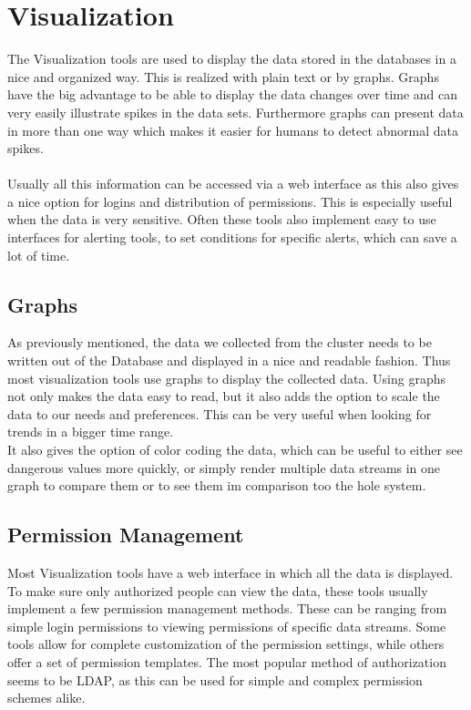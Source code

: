 \section{Visualization} 
The Visualization tools are used to display the data stored in the databases in a nice and organized way. This is realized with plain text or by graphs. Graphs have the big advantage to be able to display the data changes over time and can very easily illustrate spikes in the data sets. Furthermore graphs can present data in more than one way which makes it easier for humans to detect abnormal data spikes.\\
\\ 
Usually all this information can be accessed via a web interface as this also gives a nice option for logins and distribution of permissions. This is especially useful when the data is very sensitive.
Often these tools also implement easy to use interfaces for alerting tools, to set conditions for specific alerts, which can save a lot of time.

\subsection{Graphs}
As previously mentioned, the data we collected from the cluster needs to be written out of the Database and displayed in a nice and readable fashion. Thus most visualization tools use graphs to display the collected data. 
Using graphs not only makes the data easy to read, but it also adds the option to scale the data to our needs and preferences. This can be very useful when looking for trends in a bigger time range.\\
It also gives the option of color coding the data, which can be useful to either see dangerous values more quickly, or simply render multiple data streams in one graph to compare them or to see them im comparison too the hole system.
\subsection{Permission Management}
Most Visualization tools have a web interface in which all the data is displayed. To make sure only authorized people can view the data, these tools usually implement a few permission management methods. 
These can be ranging from simple login permissions to viewing permissions of specific data streams. Some tools allow for complete customization of the permission settings, while others offer a set of permission templates. The most popular method of authorization seems to be LDAP, as this can be used for simple and complex permission schemes alike. 
